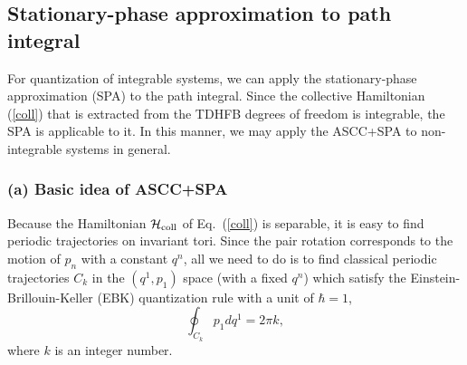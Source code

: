 \documentclass[11pt]{book} %
\begin{document}


\subsection{Stationary-phase approximation to path integral}
\label{sec:SPA}

For quantization of integrable systems,
we can apply the stationary-phase approximation (SPA)
to the path integral.
Since the collective Hamiltonian (\ref{coll}) that is
extracted from the TDHFB degrees of freedom is integrable,
the SPA is applicable to it.
In this manner, we may apply the ASCC+SPA to
non-integrable systems in general.


\subsubsection{(a) Basic idea of ASCC+SPA}

Because the Hamiltonian $\mathcal{H}_{\rm coll}$ of Eq.~(\ref{coll})
is separable,
it is easy to find periodic trajectories on invariant tori.
Since the pair rotation corresponds to the motion of $p_n$
with a constant $q^n$,
all we need to do is to find classical periodic trajectories $C_k$ in
the $(q^1,p_1)$ space (with a fixed $q^n$) which satisfy
the Einstein-Brillouin-Keller (EBK) quantization rule
with a unit of $\hbar=1$,
\begin{equation}
	\oint_{C_k} p_1dq^1 = 2\pi k ,
	\label{EBK2}
\end{equation}
where $k$ is an integer number.
\end{document}

